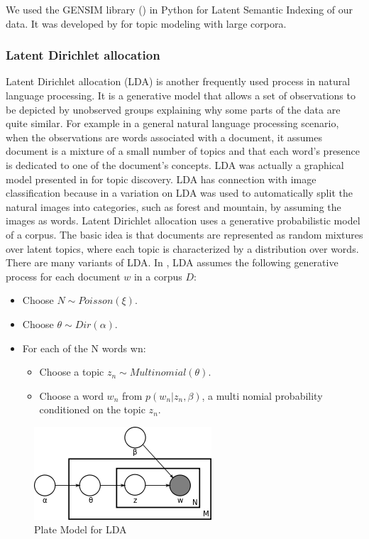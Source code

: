 We used the GENSIM library (\citet*{gensim}) in Python for Latent Semantic Indexing of our data. It was developed by \citet*{radimrehurek} for topic modeling with large corpora.
		 
\subsubsection{Latent Dirichlet allocation}
Latent Dirichlet allocation (LDA) is another frequently used process in natural language processing. It is a generative model 
that allows a set of observations to be depicted by unobserved groups explaining why some parts of the data are quite similar. For example in a general natural language processing scenario, when the observations are words associated with a document, it assumes document is a mixture of a small number of topics and that each word's presence is dedicated to one of the document's concepts. LDA was actually a graphical model presented in \citet*{Blei} for topic discovery.  LDA has connection with image classification because in \citet*{Li} a variation on LDA was used to automatically split the natural images into categories, such as  forest and 
mountain, by assuming the images as words. Latent Dirichlet allocation uses a generative probabilistic 
model of a corpus. The basic idea is that documents are represented as random mixtures over latent topics, where each topic is 
characterized by a distribution over words. There are many variants of LDA. In \citet*{Blei}, LDA assumes the following generative process for each document $w$ in a corpus $D$:
	\begin{itemize}
	\item Choose $N \sim Poisson(\xi)$.
	\item Choose $\theta \sim Dir(\alpha)$.
	\item For each of the N words wn:
	\begin{itemize}
		\item  Choose a topic $z_n \sim Multinomial(\theta).$
		\item Choose a word $w_n$ from $p(w_n | z_n,\beta)$, a multi nomial probability conditioned on the topic $z_n$.
	\end{itemize}
	\end{itemize}
 \begin{center}
\begin{figure}
\centering
\includegraphics[width=\linewidth]{./Pictures/Latent_Dirichlet_allocation.png}
\caption{Plate Model for  LDA  \citet*{Blei}}
\label{fig:ldaExample}
\end{figure}
\end{center}
